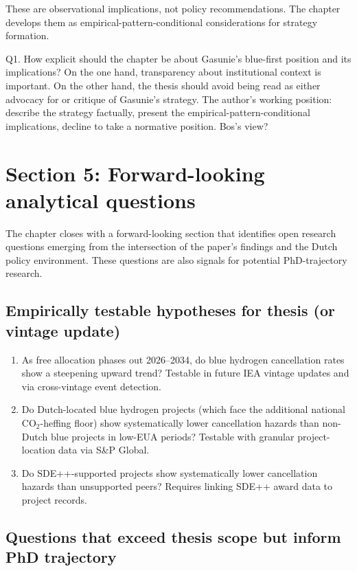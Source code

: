 \documentclass[11pt,a4paper]{article}
\begin{document}
These are observational implications, not policy recommendations. The chapter develops them as empirical-pattern-conditional considerations for strategy formation.

\begin{openquestion}
Q1. How explicit should the chapter be about Gasunie's blue-first position and its implications? On the one hand, transparency about institutional context is important. On the other hand, the thesis should avoid being read as either advocacy for or critique of Gasunie's strategy. The author's working position: describe the strategy factually, present the empirical-pattern-conditional implications, decline to take a normative position. Bos's view?
\end{openquestion}

\newpage

\section{Section 5: Forward-looking analytical questions}

The chapter closes with a forward-looking section that identifies open research questions emerging from the intersection of the paper's findings and the Dutch policy environment. These questions are also signals for potential PhD-trajectory research.

\subsection{Empirically testable hypotheses for thesis (or vintage update)}

\begin{enumerate}
  \item As free allocation phases out 2026--2034, do blue hydrogen cancellation rates show a steepening upward trend? Testable in future IEA vintage updates and via cross-vintage event detection.
  \item Do Dutch-located blue hydrogen projects (which face the additional national CO$_2$-heffing floor) show systematically lower cancellation hazards than non-Dutch blue projects in low-EUA periods? Testable with granular project-location data via S\&P Global.
  \item Do SDE++-supported projects show systematically lower cancellation hazards than unsupported peers? Requires linking SDE++ award data to project records.
\end{enumerate}

\subsection{Questions that exceed thesis scope but inform PhD trajectory}
\end{document}
